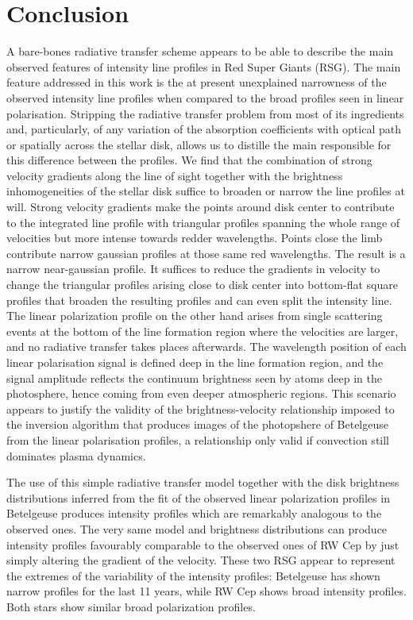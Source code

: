 \documentclass{/Users/art2/TeX/aanda/aa}
\begin{document}
\section{Conclusion}

A bare-bones radiative transfer scheme appears to be able to describe the main observed features of intensity line profiles in Red Super Giants (RSG). 
The main feature addressed in this work is the at present unexplained narrowness of the observed intensity line profiles when compared to the 
broad profiles seen in linear polarisation.  
Stripping the radiative transfer problem from most of its ingredients and, particularly, of any variation of the absorption coefficients 
with optical path or spatially across the stellar disk, allows us to distille the main responsible for this difference between the profiles. We find 
that the combination of strong velocity gradients along the line of sight together with the brightness inhomogeneities of the stellar disk suffice 
to broaden or narrow the line profiles at will. Strong velocity gradients make the points around disk center to contribute to the integrated 
line profile with triangular profiles spanning the whole range of velocities but more intense towards redder wavelengths. Points close the limb contribute 
narrow gaussian profiles at those same red wavelengths. The result is a narrow near-gaussian profile. It suffices to reduce the gradients in velocity 
to change the triangular profiles arising close to disk center into bottom-flat square profiles that broaden the resulting profiles and can even 
split the intensity line. The linear polarization profile on the other hand arises from single scattering events at the bottom of the line formation 
region where the velocities are larger, and no radiative transfer takes places afterwards. The wavelength position of each linear polarisation signal 
is defined deep in the line formation region, and the signal amplitude reflects the continuum brightness seen by atoms deep in the photosphere, hence 
coming from even deeper atmospheric regions. This scenario appears to justify the validity of the brightness-velocity relationship imposed to the 
inversion algorithm that produces images of the photopshere of Betelgeuse from the linear polarisation profiles, a relationship only valid if convection 
still dominates plasma dynamics.

The use of this simple radiative transfer model together with the disk brightness distributions inferred from the fit of the observed 
linear polarization profiles in Betelgeuse produces intensity profiles which are remarkably analogous to the observed ones. The very same model and 
brightness distributions can produce intensity profiles favourably comparable to the observed ones of RW Cep by just simply altering the gradient 
of the velocity. These two RSG appear to represent the extremes of the variability of the intensity profiles: Betelgeuse has shown narrow profiles 
for the last 11 years, while RW Cep shows broad intensity profiles. Both stars show similar broad polarization profiles.
\end{document}

